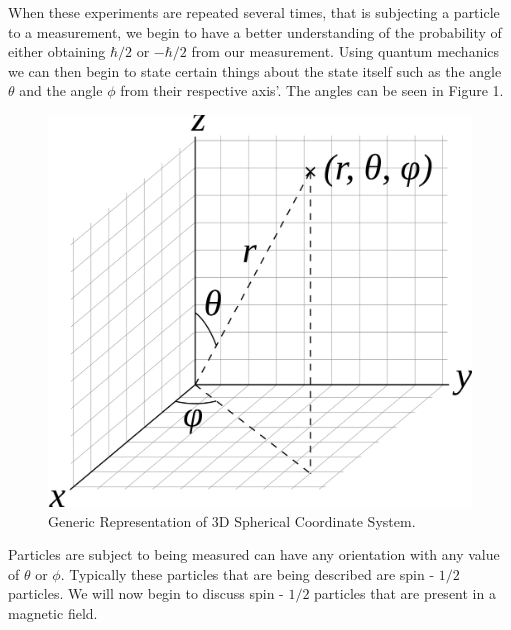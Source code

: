 \documentclass[twocolumn]{article}
\begin{document}
When these experiments are repeated several times, that is subjecting a particle to a measurement, we begin to have a better understanding of the probability of either obtaining $\hbar/2$ or $-\hbar/2$ from our measurement. Using quantum mechanics we can then begin to state certain things about the state itself such as the angle $\theta$ and the angle $\phi$ from their respective axis'. The angles can be seen in Figure 1.
\begin{figure}[htbp]
\begin{center}
\includegraphics[width=0.75\linewidth]{Spherical-Coordinate-System.png}
\caption{Generic Representation of 3D Spherical Coordinate System.}
\end{center}
\end{figure}
\newline
\newline
Particles are subject to being measured can have any orientation with any value of $\theta$ or $\phi$. Typically these particles that are being described are spin - $1/2$ particles. We will now begin to discuss spin - $1/2$ particles that are present in a magnetic field.
\end{document}
